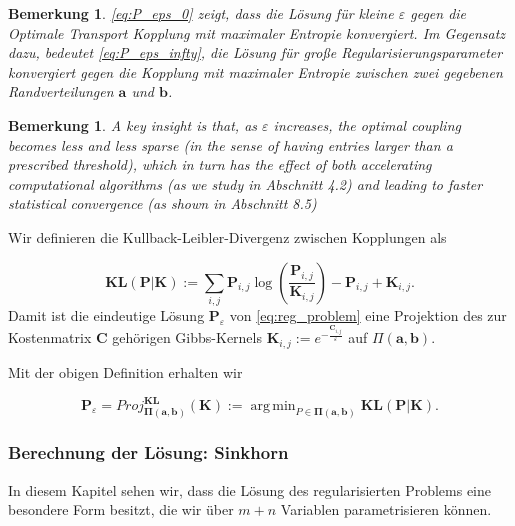 \documentclass[twoside, 11pt,a4paper]{article}
\DeclareMathOperator*{\argmin}{arg\,min}
\newtheorem{remark}[theorem]{Bemerkung}
\numberwithin{equation}{section}
\begin{document}
	\begin{remark}
		\autoref{eq:P_eps_0} zeigt, dass die Lösung für kleine $\varepsilon$ gegen die Optimale Transport Kopplung mit maximaler Entropie konvergiert. Im Gegensatz dazu, bedeutet \autoref{eq:P_eps_infty}, die Lösung für große Regularisierungsparameter konvergiert gegen die Kopplung mit maximaler Entropie zwischen zwei gegebenen Randverteilungen $\boldsymbol{a}$ und $\boldsymbol{b}$.\\
		
	\end{remark}
	
	\begin{remark}
		A key insight is that, as $\varepsilon$ increases, the optimal coupling
		becomes less and less sparse (in the sense of having entries larger than a prescribed
		threshold), which in turn has the effect of both accelerating computational algorithms
		(as we study in Abschnitt 4.2) and leading to faster statistical convergence (as shown in Abschnitt 8.5)
	\end{remark}
	
	Wir definieren die Kullback-Leibler-Divergenz zwischen Kopplungen als
	
	\begin{equation}
	\boldsymbol{KL}(\boldsymbol{P}|\boldsymbol{K}) := \sum_{i,j} \boldsymbol{P}_{i,j} \log \left(\frac{\boldsymbol{P}_{i,j}}{\boldsymbol{K}_{i,j}} \right) - \boldsymbol{P}_{i,j} + \boldsymbol{K}_{i,j}.
	\end{equation}
	Damit ist die eindeutige Lösung $\boldsymbol{P}_\varepsilon$ von \autoref{eq:reg_problem} eine Projektion des zur Kostenmatrix $\boldsymbol{C}$ gehörigen Gibbs-Kernels $\boldsymbol{K}_{i,j} := e^{-\frac{\boldsymbol{C}_{i,j}}{\varepsilon}}$ auf $\Pi (\boldsymbol{a}, \boldsymbol{b})$.
	
	Mit der obigen Definition erhalten wir
	
	\begin{equation}
	\boldsymbol{P}_\varepsilon = Proj_{\boldsymbol{\Pi} (\boldsymbol{a}, \boldsymbol{b})}^{\boldsymbol{KL}}(\boldsymbol{K}) := \argmin_{P \in \boldsymbol{\Pi} (\boldsymbol{a}, \boldsymbol{b})}{\boldsymbol{KL}(\boldsymbol{P}|\boldsymbol{K})}.
	\end{equation}
	
	\subsubsection{Berechnung der Lösung: Sinkhorn}
	In diesem Kapitel sehen wir, dass die Lösung des regularisierten Problems eine besondere Form besitzt, die wir über $m+n$ Variablen parametrisieren können.
	
\end{document}

